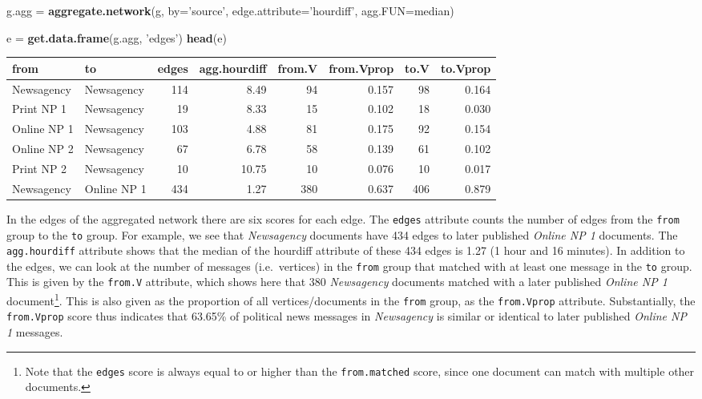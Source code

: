\documentclass[]{article}
\newenvironment{Shaded}{\begin{snugshade}}{\end{snugshade}}
\newcommand{\KeywordTok}[1]{\textcolor[rgb]{0.13,0.29,0.53}{\textbf{{#1}}}}
\newcommand{\DataTypeTok}[1]{\textcolor[rgb]{0.13,0.29,0.53}{{#1}}}
\newcommand{\StringTok}[1]{\textcolor[rgb]{0.31,0.60,0.02}{{#1}}}
\newcommand{\NormalTok}[1]{{#1}}
\let\rmarkdownfootnote\footnote%
\def\footnote{\protect\rmarkdownfootnote}
\begin{document}
\begin{Shaded}
\begin{Highlighting}[]
\NormalTok{g.agg =}\StringTok{ }\KeywordTok{aggregate.network}\NormalTok{(g, }\DataTypeTok{by=}\StringTok{'source'}\NormalTok{, }\DataTypeTok{edge.attribute=}\StringTok{'hourdiff'}\NormalTok{, }\DataTypeTok{agg.FUN=}\NormalTok{median)}

\NormalTok{e =}\StringTok{ }\KeywordTok{get.data.frame}\NormalTok{(g.agg, }\StringTok{'edges'}\NormalTok{)}
\KeywordTok{head}\NormalTok{(e)}
\end{Highlighting}
\end{Shaded}

\begin{longtable}[c]{@{}llrrrrrr@{}}
\toprule
from & to & edges & agg.hourdiff & from.V & from.Vprop & to.V &
to.Vprop\tabularnewline
\midrule
\endhead
Newsagency & Newsagency & 114 & 8.49 & 94 & 0.157 & 98 &
0.164\tabularnewline
Print NP 1 & Newsagency & 19 & 8.33 & 15 & 0.102 & 18 &
0.030\tabularnewline
Online NP 1 & Newsagency & 103 & 4.88 & 81 & 0.175 & 92 &
0.154\tabularnewline
Online NP 2 & Newsagency & 67 & 6.78 & 58 & 0.139 & 61 &
0.102\tabularnewline
Print NP 2 & Newsagency & 10 & 10.75 & 10 & 0.076 & 10 &
0.017\tabularnewline
Newsagency & Online NP 1 & 434 & 1.27 & 380 & 0.637 & 406 &
0.879\tabularnewline
\bottomrule
\end{longtable}

In the edges of the aggregated network there are six scores for each
edge. The \texttt{edges} attribute counts the number of edges from the
\texttt{from} group to the \texttt{to} group. For example, we see that
\emph{Newsagency} documents have 434 edges to later published
\emph{Online NP 1} documents. The \texttt{agg.hourdiff} attribute shows
that the median of the hourdiff attribute of these 434 edges is 1.27 (1
hour and 16 minutes). In addition to the edges, we can look at the
number of messages (i.e.~vertices) in the \texttt{from} group that
matched with at least one message in the \texttt{to} group. This is
given by the \texttt{from.V} attribute, which shows here that 380
\emph{Newsagency} documents matched with a later published \emph{Online
NP 1} document\footnote{Note that the \texttt{edges} score is always
  equal to or higher than the \texttt{from.matched} score, since one
  document can match with multiple other documents.}. This is also given
as the proportion of all vertices/documents in the \texttt{from} group,
as the \texttt{from.Vprop} attribute. Substantially, the
\texttt{from.Vprop} score thus indicates that 63.65\% of political news
messages in \emph{Newsagency} is similar or identical to later published
\emph{Online NP 1} messages.
\end{document}
